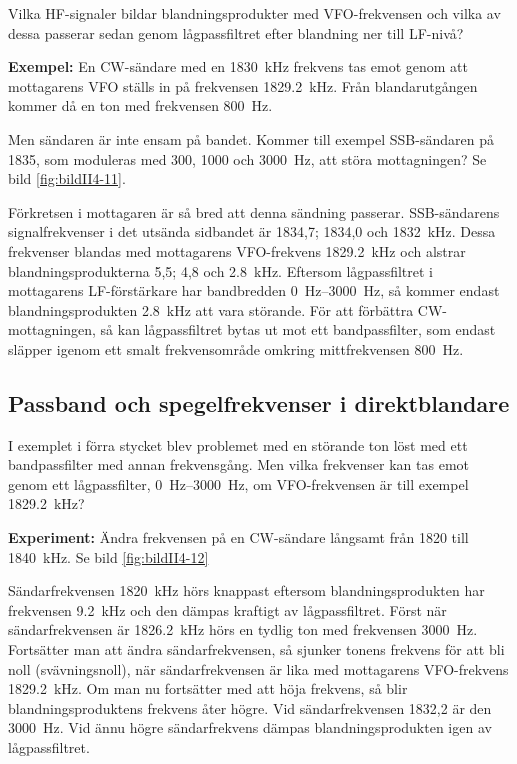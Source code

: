 Vilka HF-signaler bildar blandningsprodukter med VFO-frekvensen och
vilka av dessa passerar sedan genom lågpassfiltret efter blandning ner
till LF-nivå?

\textbf{Exempel:}
En CW-sändare med en  \SI{1830}{\kilo\hertz} frekvens tas emot genom att
mottagarens VFO ställs in på frekvensen \SI{1829,2}{\kilo\hertz}.
Från blandarutgången kommer då en ton med frekvensen \SI{800}{\hertz}.

Men sändaren är inte ensam på bandet.
Kommer till exempel SSB-sändaren på 1835, som moduleras med 300, 1000 och
\SI{3000}{\hertz}, att störa mottagningen?
Se bild \ref{fig:bildII4-11}.

Förkretsen i mottagaren är så bred att denna sändning passerar.
SSB-sändarens signalfrekvenser i det utsända sidbandet är 1834,7; 1834,0 och
\SI{1832}{\kilo\hertz}.
Dessa frekvenser blandas med mottagarens VFO-frekvens \SI{1829,2}{\kilo\hertz}
och alstrar blandningsprodukterna 5,5; 4,8 och \SI{2,8}{\kilo\hertz}.
Eftersom lågpassfiltret i mottagarens LF-förstärkare har bandbredden
\SIrange{0}{3000}{\hertz}, så kommer endast blandningsprodukten
\SI{2,8}{\kilo\hertz} att vara störande.
För att förbättra CW-mottagningen, så kan lågpassfiltret bytas ut mot ett
bandpassfilter, som endast släpper igenom ett smalt frekvensområde omkring
mittfrekvensen \SI{800}{\hertz}.

\subsection{Passband och spegelfrekvenser i direktblandare}
\label{passband_spegelfrekvens}

I exemplet i förra stycket blev problemet med en störande ton löst med
ett bandpassfilter med annan frekvensgång.
Men vilka frekvenser kan tas emot genom ett lågpassfilter,
\SIrange{0}{3000}{\hertz}, om VFO-frekvensen är till exempel
\SI{1829,2}{\kilo\hertz}?

\textbf{Experiment:}
Ändra frekvensen på en CW-sändare långsamt från 1820 till
\SI{1840}{\kilo\hertz}.
Se bild \ref{fig:bildII4-12}

Sändarfrekvensen \SI{1820}{\kilo\hertz} hörs knappast eftersom
blandningsprodukten har frekvensen \SI{9,2}{\kilo\hertz} och den dämpas kraftigt
av lågpassfiltret.
Först när sändarfrekvensen är \SI{1826,2}{\kilo\hertz} hörs en tydlig ton med
frekvensen \SI{3000}{\hertz}.
Fortsätter man att ändra sändarfrekvensen, så sjunker tonens frekvens för att
bli noll (svävningsnoll), när sändarfrekvensen är lika med mottagarens
VFO-frekvens \SI{1829,2}{\kilo\hertz}.
Om man nu fortsätter med att höja frekvens, så blir blandningsproduktens
frekvens åter högre.
Vid sändarfrekvensen 1832,2 är den \SI{3000}{\hertz}.
Vid ännu högre sändarfrekvens dämpas blandningsprodukten igen av lågpassfiltret.

